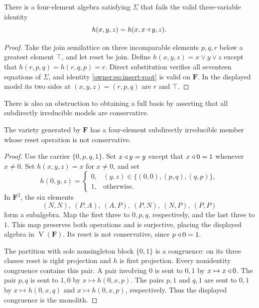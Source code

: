 \begin{proposition}
\label{owner:prop:relative-not-full}
There is a four-element algebra satisfying $\Sigma$ that fails the
valid three-variable identity
\begin{equation}\label{owner:eq:insert-root}
 h(x,y,z)=h(x,x\mathbin{\triangleleft} y,z).
\end{equation}
\end{proposition}
\begin{proof}
Take the join semilattice on three incomparable elements $p,q,r$
below a greatest element $\top$, and let reset be join. Define
$h(x,y,z)=x\vee y\vee z$ except that
$h(r,p,q)=h(r,q,p)=r$. Direct substitution verifies all seventeen
equations of $\Sigma$, and identity \eqref{owner:eq:insert-root}
is valid on $\mathbf F$. In the displayed
model its two sides at $(x,y,z)=(r,p,q)$ are $r$ and $\top$.
\end{proof}

There is also an obstruction to obtaining a full basis by asserting
that all subdirectly irreducible models are conservative.

\begin{proposition}
\label{owner:prop:nonconservative-si}
The variety generated by $\mathbf F$ has a four-element subdirectly
irreducible member whose reset operation is not conservative.
\end{proposition}
\begin{proof}
Use the carrier $\{0,p,q,1\}$. Set $x\mathbin{\triangleleft} y=y$ except that
$x\mathbin{\triangleleft}0=1$ whenever $x\ne0$. Set $h(x,y,z)=x$ for $x\ne0$,
and set
\[
 h(0,y,z)=
 \begin{cases}
 0,&(y,z)\in\{(0,0),(p,q),(q,p)\},\\
 1,&\text{otherwise}.
 \end{cases}
\]
In $\mathbf F^2$, the six elements
\[
 (N,N),\ (P,A),\ (A,P),\ (P,N),\ (N,P),\ (P,P)
\]
form a subalgebra. Map the first three to $0,p,q$, respectively,
and the last three to $1$. This map preserves both operations and is
surjective, placing the displayed algebra in
$\operatorname V(\mathbf F)$. Its reset is not conservative, since
$p\mathbin{\triangleleft}0=1$.

The partition with sole nonsingleton block $\{0,1\}$ is a congruence:
on its three classes reset is right projection and $h$ is first
projection. Every nonidentity congruence contains this pair. A pair
involving $0$ is sent to $0,1$ by $x\mapsto x\mathbin{\triangleleft}0$.
The pair $p,q$ is sent to $1,0$ by $x\mapsto h(0,x,p)$.
The pairs $p,1$ and $q,1$ are sent to $0,1$ by
$x\mapsto h(0,x,q)$ and $x\mapsto h(0,x,p)$, respectively.
Thus the displayed congruence is the monolith.
\end{proof}

